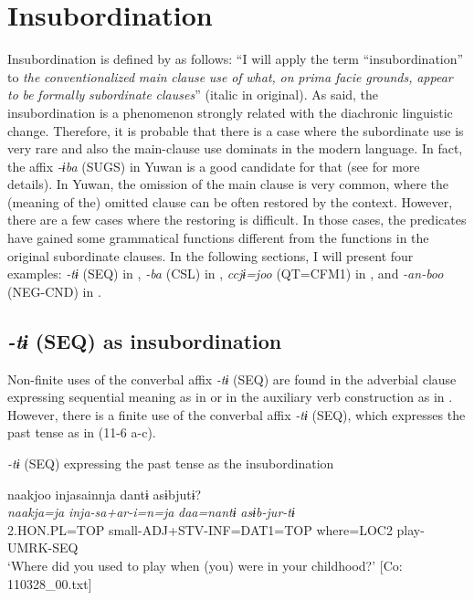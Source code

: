 \section{Insubordination}\label{sec:11.2}

Insubordination is defined by \citet[367]{Evans2007} as follows: “I will apply the term “insubordination” to \textit{the} \textit{conventionalized} \textit{main} \textit{clause} \textit{use} \textit{of} \textit{what,} \textit{on} \textit{prima} \textit{facie} \textit{grounds,} \textit{appear} \textit{to} \textit{be} \textit{formally} \textit{subordinate} \textit{clauses}” (italic in original). As \citet[367]{Evans2007} said, the insubordination is a phenomenon strongly related with the diachronic linguistic change. Therefore, it is probable that there is a case where the subordinate use is very rare and also the main-clause use dominats in the modern language. In fact, the affix \textit{{}-ɨba} (SUGS) in Yuwan is a good candidate for that (see  for more details). In Yuwan, the omission of the main clause is very common, where the (meaning of the) omitted clause can be often restored by the context. However, there are a few cases where the restoring is difficult. In those cases, the predicates have gained some grammatical functions different from the functions in the original subordinate clauses. In the following sections, I will present four examples: \textit{-tɨ} (SEQ) in , \textit{{}-ba} (CSL) in , \textit{ccjɨ=joo} (QT=CFM1) in , and \textit{{}-an-boo} (NEG-CND) in .

\subsection{\textit{{}-tɨ} (SEQ) as insubordination}\label{sec:11.2.1}

Non-finite uses of the converbal affix \textit{-tɨ} (SEQ) are found in the adverbial clause expressing sequential meaning as in  or in the auxiliary verb construction as in . However, there is a finite use of the converbal affix \textit{-tɨ} (SEQ), which expresses the past tense as in (11-6 a-c).

\ea\label{ex:11-6}  \textit{{}-tɨ} (SEQ) expressing the past tense as the insubordination

  \ea  
      \glll    naakjoo  injasainnja  dantɨ  asɨbjutɨ?\\    
      \textit{naakja=ja}  \textit{inja-sa+ar-i=n=ja}  \textit{daa=nantɨ} \textit{asɨb-jur-tɨ}\\   
      2.HON.PL=TOP  small-ADJ+STV-INF=DAT1=TOP  where=LOC2   play-UMRK-SEQ\\    
      \glt ‘Where did you used to play when (you) were in your childhood?’       [Co: 110328\_00.txt]

